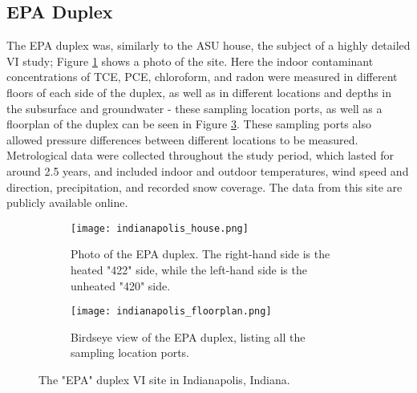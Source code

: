 \subsection{EPA Duplex}

The EPA duplex was, similarly to the ASU house, the subject of a highly detailed VI study; Figure \ref{fig:indie_house} shows a photo of the site.
Here the indoor contaminant concentrations of TCE, PCE, chloroform, and radon were measured in different floors of each side of the duplex, as well as in different locations and depths in the subsurface and groundwater - these sampling location ports, as well as a floorplan of the duplex can be seen in Figure \ref{fig:indie_floorplan}.
These sampling ports also allowed pressure differences between different locations to be measured.
Metrological data were collected throughout the study period, which lasted for around 2.5 years, and included indoor and outdoor temperatures, wind speed and direction, precipitation, and recorded snow coverage\cite{u.s._environmental_protection_agency_assessment_2015}.
The data from this site are publicly available online\cite{noauthor_indianapolis_nodate}.\par

\begin{figure}[htb!]
  \centering
  \begin{subfigure}[t]{0.35\textwidth}
    \centering
    \texttt{[image: indianapolis\_house.png]}
    \caption{Photo of the EPA duplex. The right-hand side is the heated "422" side, while the left-hand side is the unheated "420" side.}
    \label{fig:indie_house}
  \end{subfigure}
  \begin{subfigure}[t]{0.60\textwidth}
    \centering
    \texttt{[image: indianapolis\_floorplan.png]}
    \caption{Birdseye view of the EPA duplex, listing all the sampling location ports.}
    \label{fig:indie_floorplan}
  \end{subfigure}
  \caption{The "EPA" duplex VI site in Indianapolis, Indiana.}
\end{figure}

